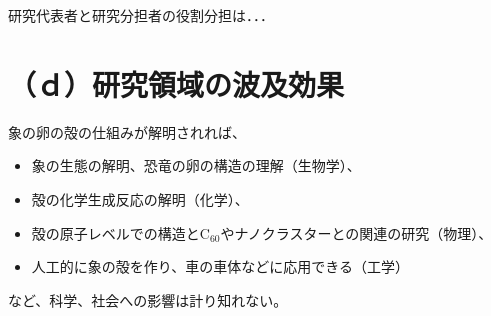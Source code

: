 \documentclass[11pt,a4j,dvipdfmx]{jarticle} 					%
\newcommand{\研究課題名}{象の卵}
\newcommand{\研究機関名}{逢坂大学}
\newcommand{\研究代表者氏名}{湯川秀樹}
\newcommand{\研究期間の最終元号年度}{7}  %
\begin{document}
	研究代表者と研究分担者の役割分担は．．．



\section{（ｄ）研究領域の波及効果}

	象の卵の殻の仕組みが解明されれば、
	\begin{itemize}
		\item 象の生態の解明、恐竜の卵の構造の理解（生物学）、
		\item 殻の化学生成反応の解明（化学）、
		\item 殻の原子レベルでの構造とC$_{60}$やナノクラスターとの関連の研究（物理）、
		\item 人工的に象の殻を作り、車の車体などに応用できる（工学）
	\end{itemize}
	など、科学、社会への影響は計り知れない。	



\end{document}
